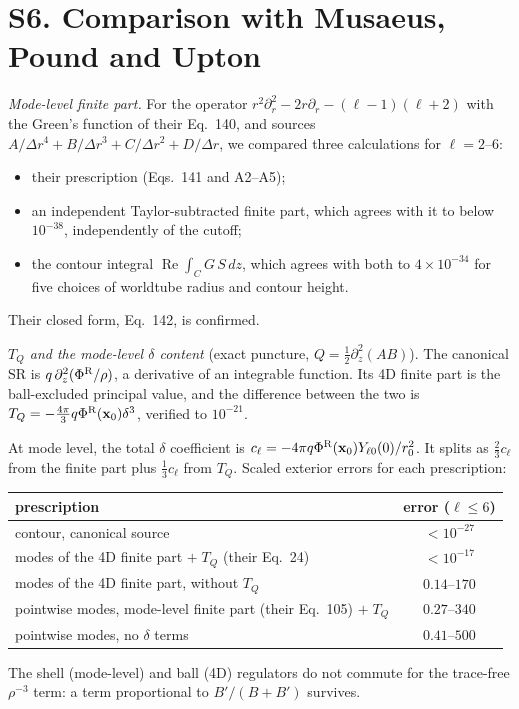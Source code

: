 \documentclass[aps,prl,onecolumn,superscriptaddress,nofootinbib,floatfix]{revtex4-2}
\renewcommand{\Re}{\operatorname{Re}}
\newcommand{\PhiR}{\Phi^{\rm R}}
\newcommand{\x}{\mathbf{x}}
\begin{document}
\section{S6. Comparison with Musaeus, Pound and Upton}
\emph{Mode-level finite part.}
For the operator $r^2\partial_r^2-2r\partial_r-(\ell-1)(\ell+2)$ with the Green's function of their Eq.~140, and sources $A/\Delta r^4+B/\Delta r^3+C/\Delta r^2+D/\Delta r$, we compared three calculations for $\ell=2$--$6$:
\begin{itemize}
\item their prescription (Eqs.~141 and A2--A5);
\item an independent Taylor-subtracted finite part, which agrees with it to below $10^{-38}$, independently of the cutoff;
\item the contour integral $\Re\int_CG\,S\,dz$, which agrees with both to $4\times10^{-34}$ for five choices of worldtube radius and contour height.
\end{itemize}
Their closed form, Eq.~142, is confirmed.

\emph{$T_Q$ and the mode-level $\delta$ content} (exact puncture, $Q=\tfrac12\partial_z^2(AB)$).
The canonical SR is $q\,\partial_z^2(\PhiR/\rho)$, a derivative of an integrable function.
Its 4D finite part is the ball-excluded principal value, and the difference between the two is $T_Q=-\tfrac{4\pi}{3}q\PhiR(\x_0)\delta^3$, verified to $10^{-21}$.

At mode level, the total $\delta$ coefficient is $c_\ell=-4\pi q\PhiR(\x_0)Y_{\ell0}(0)/r_0^2$. It splits as $\tfrac23c_\ell$ from the finite part plus $\tfrac13c_\ell$ from $T_Q$.
Scaled exterior errors for each prescription:
\begin{center}
\begin{tabular}{lc}
\hline\hline
prescription & error ($\ell\le6$)\\
\hline
contour, canonical source & $<10^{-27}$\\
modes of the 4D finite part $+\;T_Q$ (their Eq.~24) & $<10^{-17}$\\
modes of the 4D finite part, without $T_Q$ & $0.14$--$170$\\
pointwise modes, mode-level finite part (their Eq.~105) $+\;T_Q$ & $0.27$--$340$\\
pointwise modes, no $\delta$ terms & $0.41$--$500$\\
\hline\hline
\end{tabular}
\end{center}
The shell (mode-level) and ball (4D) regulators do not commute for the trace-free $\rho^{-3}$ term: a term proportional to $B'/(B+B')$ survives.
\end{document}
